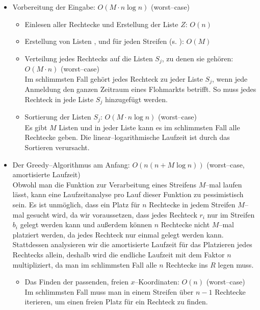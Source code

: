\begin{itemize}
	\item Vorbereitung der Eingabe: $O(M \cdot n \log n)$ (worst--case)
	\begin{itemize}
		\item Einlesen aller Rechtecke und Erstellung der Liste $Z$: $O(n)$

		\item Erstellung von Listen ,  und 
		für jeden Streifen (s. ): $O(M)$

		\item Verteilung jedes Rechtecks auf die Listen $S_j$, zu denen sie gehören: $O(M \cdot n)$ (worst--case)\\
		Im schlimmsten Fall gehört jedes Rechteck zu jeder Liste $S_j$, wenn jede Anmeldung
		den ganzen Zeitraum eines Flohmarkts betrifft.
		So muss jedes Rechteck in jede Liste $S_j$ hinzugefügt werden.

		\item Sortierung der Listen $S_j$: $O(M \cdot n \log n)$ (worst--case)\\
		Es gibt $M$ Listen und in jeder Liste kann es im schlimmsten Fall
		alle Rechtecke geben. Die linear--logarithmische Laufzeit
		ist durch das Sortieren verursacht.
	\end{itemize}

	\item Der Greedy--Algorithmus am Anfang: $O(n(n + M \log n))$ (worst--case, amortisierte Laufzeit)\\
	Obwohl man die Funktion zur Verarbeitung eines Streifens $M$--mal 
	laufen lässt, kann eine Laufzeitanalyse pro Lauf dieser Funktion zu pessimistisch sein.
	Es ist unmöglich, dass ein Platz für $n$ Rechtecke in jedem Streifen $M$--mal gesucht wird,
	da wir voraussetzen, dass jedes Rechteck $r_i$ nur im Streifen $b_i$ gelegt werden kann
	und außerdem können $n$ Rechtecke nicht $M$--mal platziert werden, da jedes Rechteck
	nur einmal gelegt werden kann.
	Stattdessen analysieren wir die amortisierte Laufzeit für das Platzieren jedes Rechtecks allein,
	deshalb wird die endliche Laufzeit mit dem Faktor $n$ multipliziert, da man im schlimmsten Fall
	alle $n$ Rechtecke ins $R$ legen muss.

	\begin{itemize}
		\item Das Finden der passenden, freien $x$--Koordinaten: $O(n)$ (worst--case)\\
		Im schlimmsten Fall muss man in einem Streifen über $n-1$ Rechtecke iterieren,
		um einen freien Platz für ein Rechteck zu finden.


\end{itemize}
\end{itemize}
